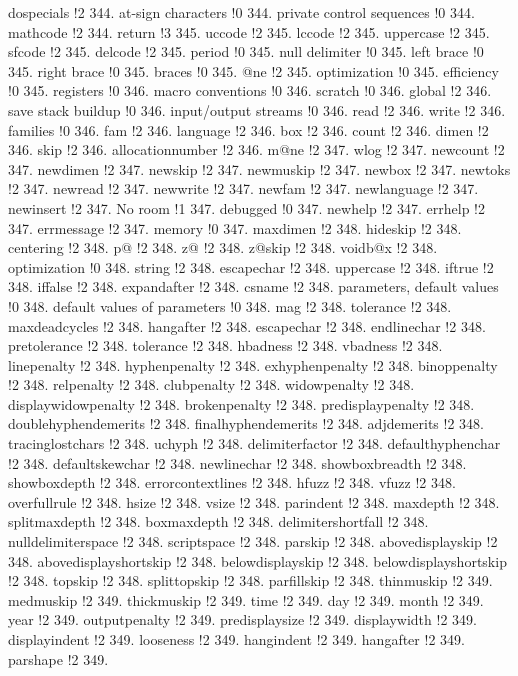 dospecials !2 344.
at-sign characters !0 344.
private control sequences !0 344.
mathcode !2 344.
return !3 345.
uccode !2 345.
lccode !2 345.
uppercase !2 345.
sfcode !2 345.
delcode !2 345.
period !0 345.
null delimiter !0 345.
left brace !0 345.
right brace !0 345.
braces !0 345.
@ne !2 345.
optimization !0 345.
efficiency !0 345.
registers !0 346.
macro conventions !0 346.
scratch !0 346.
global !2 346.
save stack buildup !0 346.
input/output streams !0 346.
read !2 346.
write !2 346.
families !0 346.
fam !2 346.
language !2 346.
box !2 346.
count !2 346.
dimen !2 346.
skip !2 346.
allocationnumber !2 346.
m@ne !2 347.
wlog !2 347.
newcount !2 347.
newdimen !2 347.
newskip !2 347.
newmuskip !2 347.
newbox !2 347.
newtoks !2 347.
newread !2 347.
newwrite !2 347.
newfam !2 347.
newlanguage !2 347.
newinsert !2 347.
No room !1 347.
debugged !0 347.
newhelp !2 347.
errhelp !2 347.
errmessage !2 347.
memory !0 347.
maxdimen !2 348.
hideskip !2 348.
centering !2 348.
p@ !2 348.
z@ !2 348.
z@skip !2 348.
voidb@x !2 348.
optimization !0 348.
string !2 348.
escapechar !2 348.
uppercase !2 348.
iftrue !2 348.
iffalse !2 348.
expandafter !2 348.
csname !2 348.
parameters, default values !0 348.
default values of parameters !0 348.
mag !2 348.
tolerance !2 348.
maxdeadcycles !2 348.
hangafter !2 348.
escapechar !2 348.
endlinechar !2 348.
pretolerance !2 348.
tolerance !2 348.
hbadness !2 348.
vbadness !2 348.
linepenalty !2 348.
hyphenpenalty !2 348.
exhyphenpenalty !2 348.
binoppenalty !2 348.
relpenalty !2 348.
clubpenalty !2 348.
widowpenalty !2 348.
displaywidowpenalty !2 348.
brokenpenalty !2 348.
predisplaypenalty !2 348.
doublehyphendemerits !2 348.
finalhyphendemerits !2 348.
adjdemerits !2 348.
tracinglostchars !2 348.
uchyph !2 348.
delimiterfactor !2 348.
defaulthyphenchar !2 348.
defaultskewchar !2 348.
newlinechar !2 348.
showboxbreadth !2 348.
showboxdepth !2 348.
errorcontextlines !2 348.
hfuzz !2 348.
vfuzz !2 348.
overfullrule !2 348.
hsize !2 348.
vsize !2 348.
parindent !2 348.
maxdepth !2 348.
splitmaxdepth !2 348.
boxmaxdepth !2 348.
delimitershortfall !2 348.
nulldelimiterspace !2 348.
scriptspace !2 348.
parskip !2 348.
abovedisplayskip !2 348.
abovedisplayshortskip !2 348.
belowdisplayskip !2 348.
belowdisplayshortskip !2 348.
topskip !2 348.
splittopskip !2 348.
parfillskip !2 348.
thinmuskip !2 349.
medmuskip !2 349.
thickmuskip !2 349.
time !2 349.
day !2 349.
month !2 349.
year !2 349.
outputpenalty !2 349.
predisplaysize !2 349.
displaywidth !2 349.
displayindent !2 349.
looseness !2 349.
hangindent !2 349.
hangafter !2 349.
parshape !2 349.

